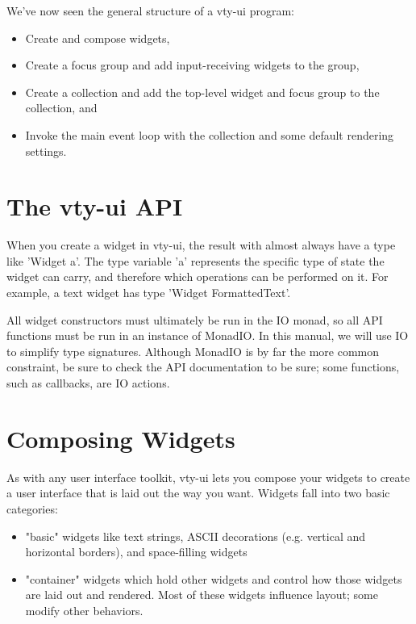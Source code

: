 \documentclass[11pt, letterpaper, oneside, titlepage]{article}
\begin{document}
We've now seen the general structure of a vty-ui program:
\begin{itemize}
\item Create and compose widgets,
\item Create a focus group and add input-receiving widgets to the group,
\item Create a collection and add the top-level widget and focus group
      to the collection, and
\item Invoke the main event loop with the collection and some default
      rendering settings.
\end{itemize}

\section{The vty-ui API}

When you create a widget in vty-ui, the result with almost always have a
type like 'Widget a'.  The type variable 'a' represents the specific
type of state the widget can carry, and therefore which operations can
be performed on it.  For example, a text widget has type 'Widget
FormattedText'.

All widget constructors must ultimately be run in the IO monad, so all
API functions must be run in an instance of MonadIO.  In this manual, we
will use IO to simplify type signatures.  Although MonadIO is by far the
more common constraint, be sure to check the API documentation to be
sure; some functions, such as callbacks, are IO actions.

\section{Composing Widgets}

As with any user interface toolkit, vty-ui lets you compose your widgets
to create a user interface that is laid out the way you want.  Widgets
fall into two basic categories:

\begin{itemize}
\item "basic" widgets like text strings, ASCII decorations
      (e.g. vertical and horizontal borders), and space-filling
      widgets
\item "container" widgets which hold other widgets and control how
      those widgets are laid out and rendered.  Most of these widgets
      influence layout; some modify other behaviors.
\end{itemize}
\end{document}
